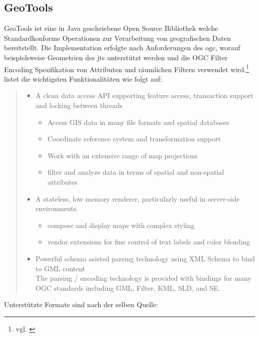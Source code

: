 \subsection{GeoTools}
\label{geotools}
GeoTools ist eine in Java geschriebene Open Source Bibliothek welche Standardkonforme Operationen zur Verarbeitung von geografischen Daten bereitstellt.
Die Implementation erfolgte nach Anforderungen des \Gls{ogc}, worauf beispielsweise Geometrien des \Gls{jts} unterstützt werden und die OGC Filter Encoding Spezifikation von Attributen und räumlichen Filtern verwendet wird.\footnote{vgl. \cite{website:geotools}}
\cite{website:geotools} listet die wichtigsten Funktionalitäten wie folgt auf:
\begin{quote}
\begin{itemize}
\item A clean data access API supporting feature access, transaction support and locking between threads
\begin{itemize}
\item Access GIS data in many file formats and spatial databases
\item Coordinate reference system and transformation support
\item Work with an extensive range of map projections
\item filter and analyze data in terms of spatial and non-spatial attributes
\end{itemize}
\item A stateless, low memory renderer, particularly useful in server-side environments.
\begin{itemize}
\item compose and display maps with complex styling
\item vendor extensions for fine control of text labels and color blending
\end{itemize}
\item Powerful schema asisted parsing technology using XML Schema to bind to GML content\\
The parsing / encoding technology is provided with bindings for many OGC standards including GML, Filter, KML, SLD, and SE.
\end{itemize}
\end{quote}
Unterstützte Formate sind nach der selben Quelle:
